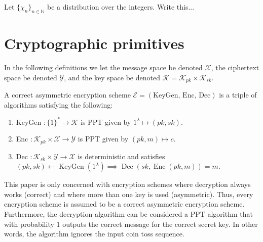 \begin{definition}
    Let $\{\chi_n\}_{n\in \mathbb{N}}$ be a distribution over the integers. Write this...
\end{definition}


\section{Cryptographic primitives}

In the following definitions we let the message space be denoted $\mathcal{X}$, the ciphertext space be denoted $\mathcal{Y}$, and the key space be denoted $\mathcal{K} = \mathcal{K}_{pk} \times \mathcal{K}_{sk}$.

\begin{definition}
A correct asymmetric encryption scheme $\mathcal{E} = (\text{KeyGen, Enc, Dec})$ is a triple of algorithms satisfying the following:
\begin{enumerate}[label={$\bullet$}]
    \item KeyGen $\colon \{1\}^* \to \mathcal{K}$ is PPT given by $1^{\lambda} \mapsto (pk,sk)$.
    \item Enc $\colon \mathcal{K}_{pk} \times \mathcal{X} \to \mathcal{Y}$ is PPT given by $(pk,m) \mapsto c$.
    \item Dec $\colon \mathcal{K}_{sk} \times \mathcal{Y} \to \mathcal{X}$ is deterministic and satisfies $(pk, sk) \leftarrow \operatorname{KeyGen}(1^{\lambda}) \implies \operatorname{Dec}(sk, \operatorname{Enc}(pk,m)) = m$.
\end{enumerate}
\end{definition}
\begin{remark}
This paper is only concerned with encryption schemes where decryption always works (correct) and where more than one key is used (asymmetric). Thus, every encryption scheme is assumed to be a correct asymmetric encryption scheme. Furthermore, the decryption algorithm can be considered a PPT algorithm that with probability 1 outputs the correct message for the correct secret key. In other words, the algorithm ignores the input coin toss sequence.
\end{remark}

